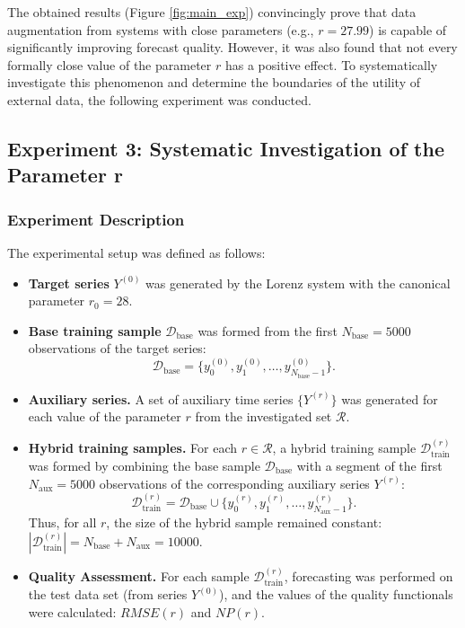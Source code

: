 \documentclass[a4paper,12pt]{extarticle}
\begin{document}
The obtained results (Figure \ref{fig:main_exp}) convincingly prove
that data augmentation from systems with close parameters (e.g., \(r=27.99\))
 is capable of significantly improving forecast quality. However, it was also found
 that not every formally close value of the parameter \(r\) has a positive effect.
  To systematically investigate this phenomenon and determine the boundaries of the utility
  of external data, the following experiment was conducted.

\subsection{Experiment 3: Systematic Investigation of the Parameter r}
\subsubsection{Experiment Description}

The experimental setup was defined as follows:
\begin{itemize}
    \item \textbf{Target series} \(Y^{(0)}\) was generated by the Lorenz system with the
     canonical parameter \(r_0 = 28\).
    
    \item \textbf{Base training sample} \(\mathcal{D}_{\text{base}}\) was
     formed from the first \(N_{\text{base}} = 5000\) observations of the target series:
    \[
    \mathcal{D}_{\text{base}} = \{y_0^{(0)}, y_1^{(0)}, \dots, y_{N_{\text{base}}-1}^{(0)}\}.
    \]
    
    \item \textbf{Auxiliary series.} A set of auxiliary
     time series \(\{Y^{(r)}\}\) was generated for each value of the parameter \(r\) from the investigated set \(\mathcal{R}\).
    
    \item \textbf{Hybrid training samples.} For each \(r \in \mathcal{R}\),
     a hybrid training sample \(\mathcal{D}_{\text{train}}^{(r)}\) was formed
     by combining the base sample \(\mathcal{D}_{\text{base}}\) with a segment of
     the first \(N_{\text{aux}} = 5000\) observations of the corresponding auxiliary series \(Y^{(r)}\):
    \[
    \mathcal{D}_{\text{train}}^{(r)} = \mathcal{D}_{\text{base}} \cup \{y_0^{(r)},
     y_1^{(r)}, \dots, y_{N_{\text{aux}}-1}^{(r)}\}.
    \]
    Thus, for all \(r\), the size of the hybrid sample remained constant: \(|\mathcal{D}_{\text{train}}^{(r)}| = N_{\text{base}} + N_{\text{aux}} = 10000\).
    
    \item \textbf{Quality Assessment.} For each sample \(\mathcal{D}_{\text{train}}^{(r)}\),
     forecasting was performed on the test data set (from series \(Y^{(0)}\)), and
      the values of the quality functionals were calculated: \(RMSE(r)\) and \(NP(r)\).
\end{itemize}
\end{document}
